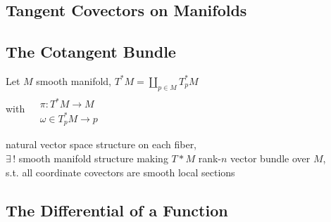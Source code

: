 \subsection*{ Tangent Covectors on Manifolds}



\subsection*{ The Cotangent Bundle}

\begin{proposition}[6.5] Let $M$ smooth manifold, $T^*M = \coprod_{p \in M} T_p^*M$ \\
with $\begin{aligned} & \quad \\ 
  & \pi : T^*M \to M \\ 
  & \omega \in T^*_pM \to p \end{aligned}$

natural vector space structure on each fiber, \\
$\exists \, !$ smooth manifold structure making $T*M$ rank-$n$ vector bundle over $M$, \\
s.t. all coordinate covectors are smooth local sections
\end{proposition}

\subsection*{ The Differential of a Function }
